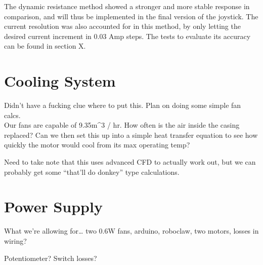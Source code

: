 The dynamic resistance method showed a stronger and more stable response
in comparison, and will thus be implemented in the final version of the
joystick. The current resolution was also accounted for in this method,
by only letting the desired current increment in 0.03 Amp steps. The
tests to evaluate its accuracy can be found in section X.

\section{Cooling System}\label{sec:cooling-system}

Didn't have a fucking clue where to put this. Plan on doing some simple
fan calcs.\\
Our fans are capable of 9.35m\^{}3 / hr. How often is the air inside the
casing replaced? Can we then set this up into a simple heat transfer
equation to see how quickly the motor would cool from its max operating
temp?

Need to take note that this uses advanced CFD to actually work out, but
we can probably get some ``that'll do donkey'' type calculations.

\section{Power Supply}\label{sec:power-supply}

What we're allowing for\ldots{} two 0.6W fans, arduino, roboclaw, two
motors, losses in wiring?

Potentiometer? Switch losses?
